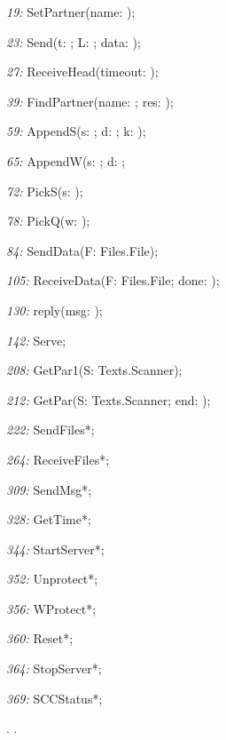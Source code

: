 \item{\it 19:} SetPartner(name: \ARRAYOF\CHAR);
\item{\it 23:} Send(t: \BYTE; L: \INTEGER; data: \ARRAYOF \BYTE);
\item{\it 27:} ReceiveHead(timeout: \LONGINT);
\item{\it 39:} FindPartner(name: \ARRAYOF\CHAR; \VAR res: \INTEGER);
\item{\it 59:} AppendS(s: \ARRAYOF\CHAR; \VAR d: \ARRAYOF \BYTE; \VAR k: \INTEGER);
\item{\it 65:} AppendW(s: \LONGINT; \VAR d: \ARRAYOF \BYTE;
\item{\it 72:} PickS(\VAR s: \ARRAYOF\CHAR);
\item{\it 78:} PickQ(\VAR w: \LONGINT);
\item{\it 84:} SendData(F: Files.File);
\item{\it 105:} ReceiveData(F: Files.File; \VAR done: \BOOLEAN);
\item{\it 130:} reply(msg: \INTEGER);
\item{\it 142:} Serve;
\item{\it 208:} GetPar1(\VAR S: Texts.Scanner);
\item{\it 212:} GetPar(\VAR S: Texts.Scanner; \VAR end: \LONGINT);
\item{\it 222:} SendFiles*;
\item{\it 264:} ReceiveFiles*;
\item{\it 309:} SendMsg*;
\item{\it 328:} GetTime*;
\item{\it 344:} StartServer*;
\item{\it 352:} Unprotect*;
\item{\it 356:} WProtect*;
\item{\it 360:} Reset*;
\item{\it 364:} StopServer*;
\item{\it 369:} SCCStatus*;

. \ORB.

